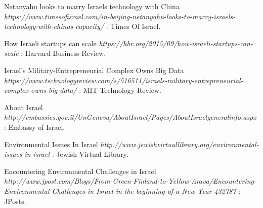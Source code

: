 \documentclass[10pt]{article}
\begin{document}
\begin{thebibliography}{1}
 Netanyahu looks to marry Israels technology with China {\em https://www.timesofisrael.com/in-beijing-netanyahu-looks-to-marry-israels-technology-with-chinas-capacity/} : Times Of Israel.

 How Israeli startups can scale {\em https://hbr.org/2015/09/how-israeli-startups-can-scale} : Harvard Business Review.

 Israel’s Military-Entrepreneurial Complex Owns Big Data {\em https://www.technologyreview.com/s/516511/israels-military-entrepreneurial-complex-owns-big-data/} : MIT Technology Review.

 About Israel {\em http://embassies.gov.il/UnGeneva/AboutIsrael/Pages/AboutIsraelgeneralinfo.aspx} : Embassy of Israel.

 Environmental Issues In Israel {\em http://www.jewishvirtuallibrary.org/environmental-issues-in-israel} : Jewish Virtual Library.

 Encountering Environmental Challenges in Israel {\em http://www.jpost.com/Blogs/From-Green-Finland-to-Yellow-Arava/Encountering-Environmental-Challenges-in-Israel-in-the-beginning-of-a-New-Year-432787} : JPosts.

\end{thebibliography}
\end{document}
